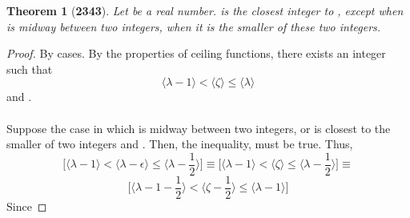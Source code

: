 \documentclass[preview]{standalone}
\newtheorem*{theorem*}{Theorem}
\begin{document}
\begin{theorem*}[\textbf{2343}]
    Let \bm{$\zeta$} be a real number. 
     is the closest integer to \bm{$\zeta$}, 
    except when \bm{$\zeta$} is midway between two integers, 
    when it is the smaller of these two integers.
\end{theorem*}

\begin{proof}
    By cases. By the properties of ceiling functions, 
    there exists an integer \bm{$\lambda$} such that 
    \begin{equation*}
        \Big \langle \lambda - 1 \Big \rangle
            < 
        \Big \langle \zeta \Big \rangle
            \leq 
        \Big \langle \lambda \Big \rangle
    \end{equation*}
    and 
    \bm{$\lceil \zeta \rceil - \zeta = \epsilon$}. 
    \\ \\
     Suppose the case in which 
    \bm{$\zeta$} is midway between two integers, 
    or is closest to the smaller of two integers 
    \bm{$\big \langle \lambda -1 \big \rangle$} and
    \bm{$\lambda$}. 
    Then, the inequality,
    must be true. Thus, 
    \begin{equation*}
        \bigg[
            \Big \langle
                \lambda - 1
            \Big \rangle
                <
            \Big \langle
                \lambda - \epsilon
            \Big \rangle
                \leq
            \Big \langle
                \lambda - \frac{1}{2}
            \Big \rangle
        \bigg]
            \equiv
        \bigg[
            \Big \langle
                \lambda - 1
            \Big \rangle
                <
            \Big \langle
                \zeta
            \Big \rangle
                \leq
            \Big \langle    
                \lambda - \frac{1}{2}
            \Big \rangle
        \bigg]
            \equiv
    \end{equation*}
    \begin{equation*}
        \bigg[
            \Big \langle
                \lambda - 1 - \frac{1}{2}
            \Big \rangle
                <
            \Big \langle 
                \zeta - \frac{1}{2}
            \Big \rangle
                \leq
            \Big \langle 
                \lambda - 1
            \Big \rangle
        \bigg]
    \end{equation*}
    Since 
\end{proof}
\end{document}
